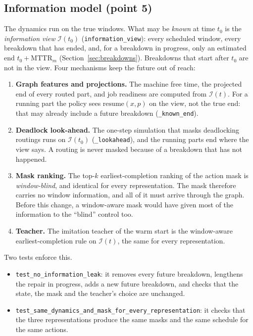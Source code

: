 \documentclass[11pt,a4paper]{article}
\newcommand{\Info}{\mathcal{I}}
\newcommand{\code}[1]{\texttt{#1}}
\begin{document}
\subsection{Information model (point 5)}
\label{sec:info}

The dynamics run on the true windows. What may be \emph{known} at time $t_0$ is the
\emph{information view} $\Info(t_0)$ (\code{information\_view}): every scheduled window, every
breakdown that has ended, and, for a breakdown in progress, only an estimated end
$t_0+\mathrm{MTTR}_m$ (Section~\ref{sec:breakdowns}). Breakdowns that start after $t_0$ are not
in the view. Four mechanisms keep the future out of reach:
\begin{enumerate}[nosep]
  \item \textbf{Graph features and projections.} The machine free time, the projected end of
        every routed part, and job readiness are computed from $\Info(t)$. For a running part the
        policy sees $\mathrm{resume}(x,p)$ on the view, not the true end: that may already
        include a future breakdown (\code{\_known\_end}).
  \item \textbf{Deadlock look-ahead.} The one-step simulation that masks deadlocking routings
        runs on $\Info(t_0)$ (\code{\_lookahead}), and the running parts end where the view says.
        A routing is never masked because of a breakdown that has not happened.
  \item \textbf{Mask ranking.} The top-$k$ earliest-completion ranking of the action mask is
        \emph{window-blind}, and identical for every representation. The mask therefore carries
        no window information, and all of it must arrive through the graph. Before this change,
        a window-aware mask would have given most of the information to the ``blind'' control too.
  \item \textbf{Teacher.} The imitation teacher of the warm start is the window-aware
        earliest-completion rule on $\Info(t)$, the same for every representation.
\end{enumerate}
Two tests enforce this.
\begin{itemize}[nosep]
  \item \code{test\_no\_information\_leak}: it removes every future breakdown, lengthens the
        repair in progress, adds a new future breakdown, and checks that the state, the mask and
        the teacher's choice are unchanged.
  \item \code{test\_same\_dynamics\_and\_mask\_for\_every\_representation}: it checks that the
        three representations produce the same masks and the same schedule for the same actions.
\end{itemize}
\end{document}
